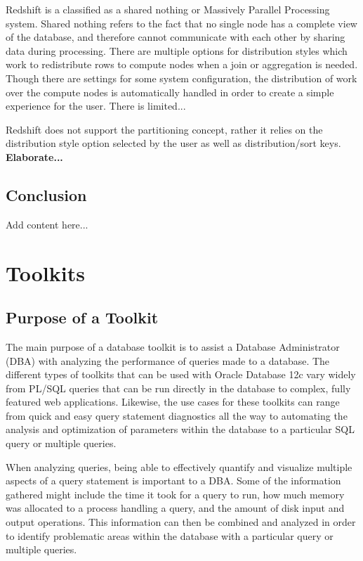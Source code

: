 \documentclass[draftclsnofoot, onecolumn, compsoc, 10pt]{IEEEtran}
\begin{document}
Redshift is a classified as a shared nothing or Massively Parallel Processing system.
Shared nothing refers to the fact that no single node has a complete view of the database, and therefore cannot communicate with each other by sharing data during processing.
There are multiple options for distribution styles which work to redistribute rows to compute nodes when a join or aggregation is needed.
Though there are settings for some system configuration, the distribution of work over the compute nodes is automatically handled in order to create a simple experience for the user. There is limited...

Redshift does not support the partitioning concept, rather it relies on the distribution style option selected by the user as well as distribution/sort keys. \textbf{Elaborate...}

\subsection{Conclusion}
Add content here...

\section{Toolkits}
\subsection{Purpose of a Toolkit}
The main purpose of a database toolkit is to assist a Database Administrator (DBA) with analyzing the performance of queries made to a database. 
The different types of toolkits that can be used with Oracle Database 12c vary widely from PL/SQL queries that can be run directly in the database to complex, fully featured web applications. 
Likewise, the use cases for these toolkits can range from quick and easy query statement diagnostics all the way to automating the analysis and optimization of parameters within the database to a particular SQL query or multiple queries. 

When analyzing queries, being able to effectively quantify and visualize multiple aspects of a query statement is important to a DBA. 
Some of the information gathered might include the time it took for a query to run, how much memory was allocated to a process handling a query, and the amount of disk input and output operations. 
This information can then be combined and analyzed in order to identify problematic areas within the database with a particular query or multiple queries. 
\end{document}
